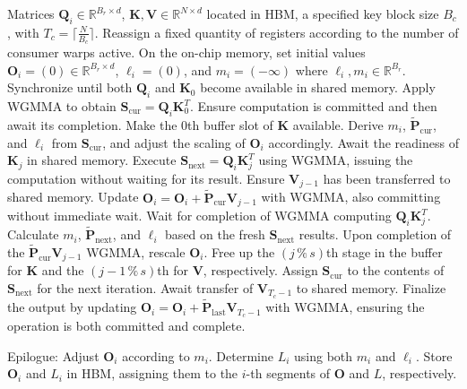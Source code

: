 \begin{algorithm}[H]
    \caption{\small\label{alg:flash3_wgmma}\textsc{FlashAttention-3} consumer warpgroup forward pass}
    \begin{algorithmic}[1]
      \REQUIRE  Matrices $\mathbf{Q}_i \in \mathbb{R}^{B_r \times d}$, $\mathbf{K}, \mathbf{V} \in \mathbb{R}^{N \times d}$ located in HBM, a specified key block size $B_c$, with $T_c = \lceil \frac{N}{B_c} \rceil$.
      \STATE Reassign a fixed quantity of registers according to the number of consumer warps active.
      \STATE On the on-chip memory, set initial values $\mathbf{O}_i = (0) \in \mathbb{R}^{B_r \times d}$, $\ell_i = (0)$, and $m_i = (-\infty)$ where $\ell_i, m_i \in \mathbb{R}^{B_r}$.
      \STATE Synchronize until both $\mathbf{Q}_i$ and $\mathbf{K}_0$ become available in shared memory.
      \STATE Apply WGMMA to obtain $\mathbf{S}_{\mathrm{cur}} = \mathbf{Q}_i \mathbf{K}_0^T$. Ensure computation is committed and then await its completion.
      \STATE Make the $0$th buffer slot of $\mathbf{K}$ available.
      \STATE Derive $m_{i}$, $\tilde{\mathbf{P}}_{\mathrm{cur}}$, and $\ell_{i}$ from $\mathbf{S}_{\mathrm{cur}}$, and adjust the scaling of $\mathbf{O}_i$ accordingly.
        \STATE Await the readiness of $\mathbf{K}_j$ in shared memory.
        \label{code:mainloop_start}
        \STATE Execute $\mathbf{S}_{\mathrm{next}} = \mathbf{Q}_i \mathbf{K}_{j}^T$ using WGMMA, issuing the computation without waiting for its result. \label{code:first_wgmma}
        \STATE Ensure $\mathbf{V}_{j-1}$ has been transferred to shared memory.
        \STATE Update $\mathbf{O}_{i} = \mathbf{O}_{i} + \tilde{\mathbf{P}}_{\mathrm{cur}} \mathbf{V}_{j-1}$ with WGMMA, also committing without immediate wait. \label{code:second_wgmma}
        \STATE Wait for completion of WGMMA computing $\mathbf{Q}_i \mathbf{K}_{j}^T$.
        \STATE Calculate $m_{i}$, $\tilde{\mathbf{P}}_{\mathrm{next}}$, and $\ell_{i}$ based on the fresh $\mathbf{S}_{\mathrm{next}}$ results. \label{code:softmax}
        \STATE Upon completion of the $\tilde{\mathbf{P}}_{\mathrm{cur}} \mathbf{V}_{j-1}$ WGMMA, rescale $\mathbf{O}_i$.
        \STATE Free up the $(j\,\%\,s)$th stage in the buffer for $\mathbf{K}$ and the $(j-1\,\%\,s)$th for $\mathbf{V}$, respectively.
        \STATE Assign $\mathbf{S}_{\mathrm{cur}}$ to the contents of $\mathbf{S}_{\mathrm{next}}$ for the next iteration.
        \label{code:mainloop_end}
      \ENDFOR \STATE Await transfer of $\mathbf{V}_{T_c - 1}$ to shared memory.
      \STATE Finalize the output by updating $\mathbf{O}_{i} = \mathbf{O}_{i} + \tilde{\mathbf{P}}_{\mathrm{last}} \mathbf{V}_{T_c - 1}$ with WGMMA, ensuring the operation is both committed and complete.

\STATE Epilogue: Adjust $\mathbf{O}_{i}$ according to $m_{i}$. Determine $L_{i}$ using both $m_{i}$ and $\ell_{i}$.
      Store $\mathbf{O}_{i}$ and $L_{i}$ in HBM, assigning them to the $i$-th segments of $\mathbf{O}$ and $L$, respectively.
    \end{algorithmic}
  \end{algorithm}


